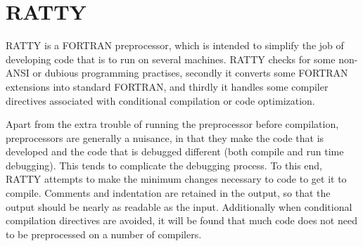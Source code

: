 \documentclass{report}
\begin{document}
\section{RATTY}
RATTY is a FORTRAN preprocessor, which is intended to simplify the job of
developing code that is to run on several machines.
RATTY checks for some non-ANSI or dubious programming
practises, secondly it converts some FORTRAN extensions into standard
FORTRAN, and thirdly it handles some compiler directives associated with
conditional compilation or code optimization.

Apart from the
extra trouble of running the preprocessor before compilation,  preprocessors
are generally a nuisance, in that they make the code that is developed
and the code that is debugged different (both compile and run time debugging).
This tends to complicate the debugging process. To this end, RATTY
attempts to make the minimum changes necessary to code to get it to compile.
Comments and indentation are retained in the output, so that the output
should
be nearly as readable as the input. Additionally when
conditional compilation directives are avoided, it will be found that much
code does not need to be preprocessed on a number of compilers.
\end{document}
